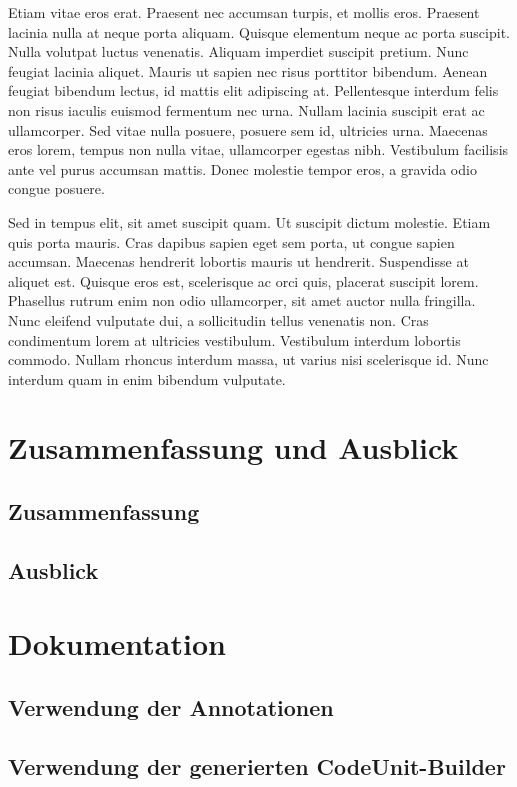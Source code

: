 \documentclass[12pt,oneside,a4paper,parskip]{scrbook}
\begin{document}
Etiam vitae eros erat. Praesent nec accumsan turpis, et mollis eros. Praesent lacinia nulla at neque porta aliquam. Quisque elementum neque ac porta suscipit. Nulla volutpat luctus venenatis. Aliquam imperdiet suscipit pretium. Nunc feugiat lacinia aliquet. Mauris ut sapien nec risus porttitor bibendum. Aenean feugiat bibendum lectus, id mattis elit adipiscing at. Pellentesque interdum felis non risus iaculis euismod fermentum nec urna. Nullam lacinia suscipit erat ac ullamcorper. Sed vitae nulla posuere, posuere sem id, ultricies urna. Maecenas eros lorem, tempus non nulla vitae, ullamcorper egestas nibh. Vestibulum facilisis ante vel purus accumsan mattis. Donec molestie tempor eros, a gravida odio congue posuere.

Sed in tempus elit, sit amet suscipit quam. Ut suscipit dictum molestie. Etiam quis porta mauris. Cras dapibus sapien eget sem porta, ut congue sapien accumsan. Maecenas hendrerit lobortis mauris ut hendrerit. Suspendisse at aliquet est. Quisque eros est, scelerisque ac orci quis, placerat suscipit lorem. Phasellus rutrum enim non odio ullamcorper, sit amet auctor nulla fringilla. Nunc eleifend vulputate dui, a sollicitudin tellus venenatis non. Cras condimentum lorem at ultricies vestibulum. Vestibulum interdum lobortis commodo. Nullam rhoncus interdum massa, ut varius nisi scelerisque id. Nunc interdum quam in enim bibendum vulputate.

\chapter{Zusammenfassung und Ausblick}
\section{Zusammenfassung}
\section{Ausblick}

\appendix
\chapter{Dokumentation}
\section{Verwendung der Annotationen}
\section{Verwendung der generierten CodeUnit-Builder}
\end{document}
